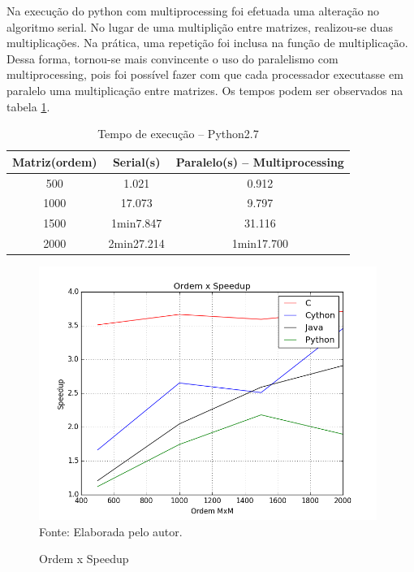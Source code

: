 \documentclass[a4paper,12pt]{article}
\begin{document}


Na execução do python com multiprocessing foi efetuada uma alteração no algoritmo serial. No lugar de uma multiplição entre matrizes, realizou-se duas multiplicações. Na prática, uma repetição foi inclusa na função de multiplicação. Dessa forma, tornou-se mais convincente o uso do paralelismo com multiprocessing, pois foi possível fazer com que cada processador executasse em paralelo uma multiplicação entre matrizes. Os tempos podem ser observados na tabela \ref{tab:timePy2}. 

\begin{table}[H]
  \centering
  \caption{Tempo de execução -- Python2.7}
  \begin{tabular}{ccc}
    \hline
    Matriz(ordem) & Serial(s) & Paralelo(s) -- Multiprocessing \\
    \hline
    \hline
    500 & 1.021 &  0.912 \\
    1000 & 17.073 & 9.797\\
    1500 & 1min7.847 & 31.116\\
    2000 & 2min27.214 & 1min17.700\\
    \hline
  \end{tabular}
  \label{tab:timePy2}
\end{table}



\begin{figure}[H]
  \centering
  \caption{Ordem x Speedup}
  \includegraphics[width=11.0cm]{pictures/speedup_full2.png}\vfill
  \footnotesize{Fonte: Elaborada pelo autor.}
  
\label{fig:speedup_full}
\end{figure}
\end{document}
